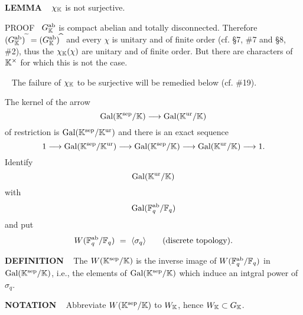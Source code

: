 \vspace{0.1cm}


\begin{x}{\small\bf LEMMA} \ %
$\chi_{\mathbb{K}}$ is not surjective.

\vspace{0.1cm}

PROOF \ 
$G_{\mathbb{K}}^{\text{ab}}$ is compact abelian and totally disconnected.  
Therefore 
$(G_{\mathbb{K}}^{\text{ab}})^{\widetilde{\ }} = (G_{\mathbb{K}}^{\text{ab}})^{\widehat{\ }}$ 
and every $\chi$ is unitary and of finite order 
(cf. \S7, \#7 and \S8, \#2), thus the $\chi_{\mathbb{K}}(\chi)$ are unitary and of finite order.  
But there are characters of $\mathbb{K}^\times$ for which this is not the case.
\end{x}

\vspace{0.1cm}

\begin{x}{\small\bf {}} \ %
The failure of $\chi_{\mathbb{K}}$ to be surjective will be remedied below (cf. \#19). 
\end{x}

\vspace{0.1cm}

The kernel of the arrow 
\[
\text{Gal}(\mathbb{K}^{\text{sep}} / \mathbb{K}) \longrightarrow \text{Gal}(\mathbb{K}^{\text{ur}} / \mathbb{K})
\]
of restriction is $\text{Gal}(\mathbb{K}^{\text{sep}} / \mathbb{K}^{\text{ur}})$ and there is an exact sequence
\[
1 \longrightarrow \text{Gal}(\mathbb{K}^{\text{sep}} / \mathbb{K}^{\text{ur}}) \longrightarrow \text{Gal}(\mathbb{K}^{\text{sep}} / \mathbb{K})  \longrightarrow \text{Gal}(\mathbb{K}^{\text{ur}} / \mathbb{K}) \longrightarrow 1.
\]
Identify
\[
\text{Gal}(\mathbb{K}^{\text{ur}} / \mathbb{K})
\]
with 
\[
\text{Gal}(\mathbb{F}_q^{\text{ab}} / \mathbb{F}_q) 
\]
and put 
\[
W(\mathbb{F}_q^{\text{ab}} / \mathbb{F}_q) \ = \ \langle \sigma_q \rangle \qquad (\text{discrete topology}).
\]

\vspace{0.2cm}

\begin{x}{\small\bf DEFINITION} \ %
The  $W(\mathbb{K}^{\text{sep}} / \mathbb{K})$ is the inverse image of $W(\mathbb{F}_q^{\text{ab}} / \mathbb{F}_q)$ in $\text{Gal}(\mathbb{K}^{\text{sep}} / \mathbb{K})$, 
i.e., the elements of $\text{Gal}(\mathbb{K}^{\text{sep}} / \mathbb{K})$ which induce an intgral power of $\sigma_q$.
\end{x}

\vspace{0.1cm}

\begin{x}{\small\bf NOTATION} \ %
Abbreviate $W(\mathbb{K}^{\text{sep}} / \mathbb{K})$  to $W_{\mathbb{K}}$, hence $W_{\mathbb{K}} \subset G_{\mathbb{K}}$.
\end{x}

